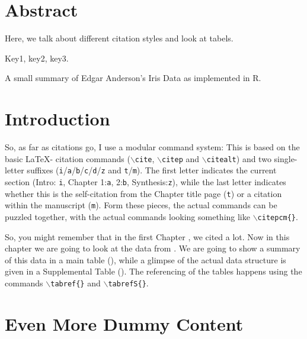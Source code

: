 \section*{Abstract}
\noindent
Here, we talk about different citation styles and look at tabels.

 Key1, key2, key3.

\begin{table*}[!ht]
\centering
\caption[Summary of Anderson's Iris Data]{\label{tab:c2t1}
A small summary of Edgar Anderson's Iris Data as implemented in R.}
\begin{small}

\end{small}
\end{table*}

\begin{multicols}{2}
\section{Introduction}

So, as far as citations go, I use a modular command system: This is based on the basic \LaTeX - citation commands (\texttt{$\backslash$cite}, \texttt{$\backslash$citep} and \texttt{$\backslash$citealt}) and two single-letter suffixes (\texttt{i}/\texttt{a}/\texttt{b}/\texttt{c}/\texttt{d}/\texttt{z} and \texttt{t}/\texttt{m}). The first letter indicates the current section (Intro: \texttt{i}, Chapter 1:\texttt{a}, 2:\texttt{b}, Synthesis:\texttt{z}), while the last letter indicates whether this is the self-citation from the Chapter title page (\texttt{t}) or a citation within the manuscript (\texttt{m}).
Form these pieces, the actual commands can be puzzled together, with the actual commands looking something like \texttt{$\backslash$citepcm\{\}}.

So, you might remember that in the first Chapter , we cited  a lot.
Now in this chapter we are going to look at the data from .
We are going to show a summary of this data in a main table (), while a glimpse of the actual data structure is given in a Supplemental Table ().
The referencing of the tables happens using the commands \texttt{$\backslash$tabref\{\}} and \texttt{$\backslash$tabrefS\{\}}.

\section{Even More Dummy Content}
\textcolor{black!35}{\lipsum[7-8]}


\end{multicols}
